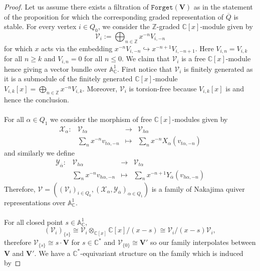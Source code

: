 \documentclass{amsart}
\theoremstyle{plain}
\numberwithin{equation}{section}
\theoremstyle{definition}
\theoremstyle{remark}
\begin{document}
	\begin{proof}
		Let us assume there exists a filtration of $\texttt{Forget}(\mathbf{V})$ as in the statement of the proposition for which the corresponding graded representation of $\overline{Q}$ is stable. For every vertex $i\in Q_0$, we consider the $\mathbb{Z}$-graded $\mathbb{C}[x]$-module given by 
		\begin{equation}\label{reesModule}
			\mathcal{V}_i:=\bigoplus_{n\in \mathbb{Z}}x^{-n}V_{i,-n}
		\end{equation}
		for which $x$ acts via the embedding $x^{-n}V_{i,-n}\hookrightarrow x^{-n+1}V_{i,-n+1}$. Here $V_{i,n}=V_{i,k}$ for all $n\geq k$ and $V_{i,n}=0$ for all $n\leq 0$. We claim that $\mathcal{V}_i$ is a free $\mathbb{C}[x]$-module hence giving a vector bundle over $\mathbb{A}^1_{\mathbb{C}}$. First notice that $\mathcal{V}_i$ is finitely generated as it is a submodule of the finitely generated $\mathbb{C}[x]$-module $V_{i,k}[x]=\bigoplus_{n\in\mathbb{Z}}x^{-n}V_{i,k}$. Moreover, $\mathcal{V}_i$ is torsion-free because $V_{i,k}[x]$ is and hence the conclusion. 
		\\
		\\
		For all $\alpha\in Q_1$ we consider the morphism of free $\mathbb{C}[x]$-modules given by 
		$$
		\begin{matrix}
			\mathcal{X}_\alpha:&\mathcal{V}_{t\alpha} & \longrightarrow & \mathcal{V}_{h\alpha} \\
			&\sum_nx^{-n}v_{t\alpha,-n}&\longmapsto&\sum_nx^{-n}X_{\alpha}(v_{t\alpha,-n})
		\end{matrix}
		$$
		and similarly we define 
		$$\begin{matrix}
			\mathcal{Y}_{\overline{\alpha}}:&\mathcal{V}_{h\alpha}&\longrightarrow & \mathcal{V}_{t\alpha} \\
			&\sum_nx^{-n}v_{h\alpha,-n}&\longmapsto&\sum_nx^{-n+1}Y_{\overline{\alpha}}(v_{h\alpha,-n})
		\end{matrix}$$ 
		Therefore, $\mathcal{V}=((\mathcal{V}_i)_{i\in Q_0},(\mathcal{X}_{\alpha},\mathcal{Y}_{\overline{\alpha}})_{\alpha\in Q_1})$ is a family of Nakajima quiver representations over $\mathbb{A}^1_\mathbb{C}$. 
		\\
		\\
		For all closed point $s\in \mathbb{A}^1_\mathbb{C}$, 
		$$
		(\mathcal{V}_i)_{\{s\}}\cong \mathcal{V}_i\otimes_{\mathbb{C}[x]}\mathbb{C}[x]/(x-s)\cong \mathcal{V}_i/(x-s)\mathcal{V}_i, 
		$$
		therefore $\mathcal{V}_{\{s\}}\cong s\cdot \mathbf{V}$ for $s\in \mathbb{C}^*$ and $\mathcal{V}_{\{0\}}\cong \mathbf{V}'$ so our family interpolates between $\mathbf{V}$ and $\mathbf{V}'$. We have a $\mathbb C^*$-equivariant structure on the family which is induced by

\end{proof}
\end{document}
